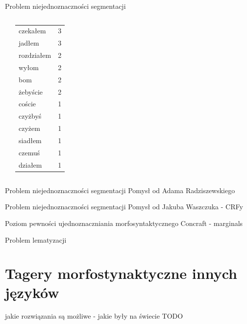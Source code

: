 \documentclass{beamer}
\begin{document}
\begin{frame}{Problem niejednoznaczności segmentacji}
\begin{columns}[c]
\begin{center}
    \end{center}
    \begin{center}
      \footnotesize
      \begin{tabular}{l|r}
        czekałem & 3 \\
        jadłem & 3 \\
        rozdziałem & 2 \\
        wyłom & 2 \\
        bom & 2 \\
        żebyście & 2 \\
        coście & 1 \\
        czyżbyś & 1 \\
        czyżem & 1 \\
        siadłem & 1 \\
        czemuś & 1 \\
        działem & 1 \\
      \end{tabular}
    \end{center}
  \end{columns}
\end{frame}

\begin{frame}{Problem niejednoznaczności segmentacji}
  Pomysł od Adama Radziszewskiego
\end{frame}

\begin{frame}{Problem niejednoznaczności segmentacji}
  Pomysł od Jakuba Waszczuka - CRFy
\end{frame}

\begin{frame}{Poziom pewności ujednoznaczniania morfosyntaktycznego}
  Concraft - marginals
\end{frame}

\begin{frame}{Problem lematyzacji}
\end{frame}

\section{Tagery morfostynaktyczne innych języków}
\frame{\sectionpage}

\begin{frame}{jakie rozwiązania są możliwe - jakie były na świecie}
  TODO
\end{frame}
\end{document}

